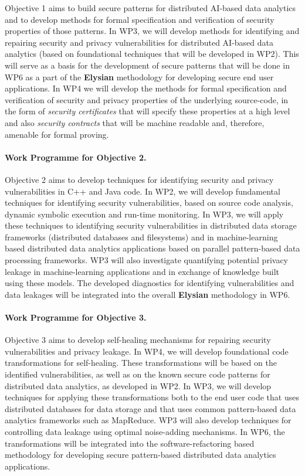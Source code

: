 \documentclass[a4paper,11pt]{article}
\newcommand{\project}[1]{\textbf{#1}\xspace}
\newcommand{\SECURITY}{\project{Elysian}}
\newcommand{\TheProject}{\SECURITY}
\begin{document}
Objective 1 aims to build secure patterns for distributed AI-based data analytics and to develop methods for formal specification and verification of security properties of those patterns. In WP3, we will develop methods for identifying and repairing security and privacy vulnerabilities for distributed AI-based data analytics (based on foundational techniques that will be developed in WP2). This will serve as a basis for the development of secure patterns that will be done in WP6 as a part of the \TheProject{} methodology for developing secure end user applications. In WP4 we will develop the methods for formal specification and verification of security and privacy properties of the underlying source-code, in the form of \emph{security certificates} that will specify these properties at a high level and also \emph{security contracts} that will be machine readable and, therefore, amenable for formal proving. 

\paragraph*{Work Programme for Objective 2.}

Objective 2 aims to develop techniques for identifying security and privacy vulnerabilities in C++ and Java code. In WP2, we will develop fundamental techniques for identifying security vulnerabilities, based on source code analysis, dynamic symbolic execution and run-time monitoring. In WP3, we will apply these techniques to identifying security vulnerabilities in distributed data storage frameworks (distributed databases and filesystems) and in machine-learning based distributed data analytics applications based on parallel pattern-based data processing frameworks. WP3 will also investigate quantifying potential privacy leakage in machine-learning applications and in exchange of knowledge built using these models. The developed diagnostics for identifying vulnerabilities and data leakages will be integrated into the overall \TheProject{} methodology in WP6.

\paragraph{Work Programme for Objective 3.}

Objective 3 aims to develop self-healing mechanisms for repairing security vulnerabilities and privacy leakage. In WP4, we will develop foundational code transformations for self-healing. These transformations will be based on the identified vulnerabilities, as well as on the known secure code patterns for distributed data analytics, as developed in WP2. In WP3, we will develop techniques for applying these transformations both to the end user code that uses distributed databases for data storage and that uses common pattern-based data analytics frameworks such as MapReduce. WP3 will also develop techniques for controlling data leakage using optimal noise-adding mechanisms. In WP6, the transformations will be integrated into the software-refactoring based methodology for developing secure pattern-based distributed data analytics applications. 
\end{document}
